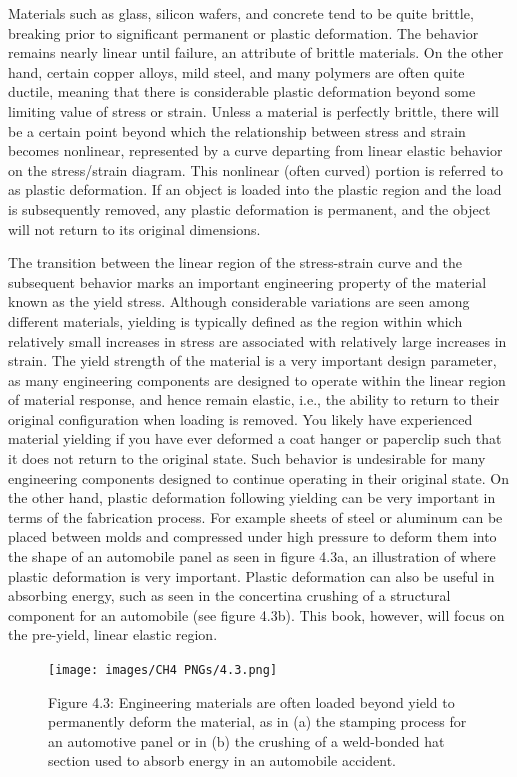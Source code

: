\documentclass[
  letterpaper,
  DIV=11,
  numbers=noendperiod]{scrreprt}
\begin{document}
Materials such as glass, silicon wafers, and concrete tend to be quite
brittle, breaking prior to significant permanent or plastic deformation.
The behavior remains nearly linear until failure, an attribute of
brittle materials. On the other hand, certain copper alloys, mild steel,
and many polymers are often quite ductile, meaning that there is
considerable plastic deformation beyond some limiting value of stress or
strain. Unless a material is perfectly brittle, there will be a certain
point beyond which the relationship between stress and strain becomes
nonlinear, represented by a curve departing from linear elastic behavior
on the stress/strain diagram. This nonlinear (often curved) portion is
referred to as plastic deformation. If an object is loaded into the
plastic region and the load is subsequently removed, any plastic
deformation is permanent, and the object will not return to its original
dimensions.

The transition between the linear region of the stress-strain curve and
the subsequent behavior marks an important engineering property of the
material known as the yield stress. Although considerable variations are
seen among different materials, yielding is typically defined as the
region within which relatively small increases in stress are associated
with relatively large increases in strain. The yield strength of the
material is a very important design parameter, as many engineering
components are designed to operate within the linear region of material
response, and hence remain elastic, i.e., the ability to return to their
original configuration when loading is removed. You likely have
experienced material yielding if you have ever deformed a coat hanger or
paperclip such that it does not return to the original state. Such
behavior is undesirable for many engineering components designed to
continue operating in their original state. On the other hand, plastic
deformation following yielding can be very important in terms of the
fabrication process. For example sheets of steel or aluminum can be
placed between molds and compressed under high pressure to deform them
into the shape of an automobile panel as seen in figure 4.3a, an
illustration of where plastic deformation is very important. Plastic
deformation can also be useful in absorbing energy, such as seen in the
concertina crushing of a structural component for an automobile (see
figure 4.3b). This book, however, will focus on the pre-yield, linear
elastic region.

\begin{figure}[H]

{\centering \texttt{[image: images/CH4 PNGs/4.3.png]}

}

\caption{Figure 4.3: Engineering materials are often loaded beyond yield
to permanently deform the material, as in (a) the stamping process for
an automotive panel or in (b) the crushing of a weld-bonded hat section
used to absorb energy in an automobile accident.}

\end{figure}%
\end{document}
